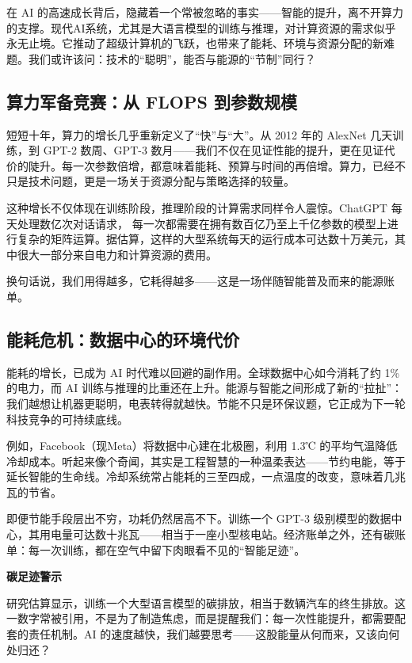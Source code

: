 在 AI 的高速成长背后，隐藏着一个常被忽略的事实——智能的提升，离不开算力的支撑。现代AI系统，尤其是大语言模型的训练与推理，对计算资源的需求似乎永无止境。它推动了超级计算机的飞跃，也带来了能耗、环境与资源分配的新难题。我们或许该问：技术的“聪明”，能否与能源的“节制”同行？

\subsection{算力军备竞赛：从 FLOPS 到参数规模}

短短十年，算力的增长几乎重新定义了“快”与“大”。从 2012 年的 AlexNet 几天训练，到 GPT-2 数周、GPT-3 数月——我们不仅在见证性能的提升，更在见证代价的陡升。每一次参数倍增，都意味着能耗、预算与时间的再倍增。算力，已经不只是技术问题，更是一场关于资源分配与策略选择的较量。

这种增长不仅体现在训练阶段，推理阶段的计算需求同样令人震惊。ChatGPT 每天处理数亿次对话请求，
每一次都需要在拥有数百亿乃至上千亿参数的模型上进行复杂的矩阵运算。据估算，这样的大型系统每天的运行成本可达数十万美元，其中很大一部分来自电力和计算资源的费用。

换句话说，我们用得越多，它耗得越多——这是一场伴随智能普及而来的能源账单。

\subsection{能耗危机：数据中心的环境代价}

能耗的增长，已成为 AI 时代难以回避的副作用。全球数据中心如今消耗了约 1\% 的电力，而 AI 训练与推理的比重还在上升。能源与智能之间形成了新的“拉扯”：我们越想让机器更聪明，电表转得就越快。节能不只是环保议题，它正成为下一轮科技竞争的可持续底线。

例如，Facebook（现Meta）将数据中心建在北极圈，利用 1.3℃ 的平均气温降低冷却成本。听起来像个奇闻，其实是工程智慧的一种温柔表达——节约电能，等于延长智能的生命线。冷却系统常占能耗的三至四成，一点温度的改变，意味着几兆瓦的节省。

即便节能手段层出不穷，功耗仍然居高不下。训练一个 GPT-3 级别模型的数据中心，其用电量可达数十兆瓦——相当于一座小型核电站。经济账单之外，还有碳账单：每一次训练，都在空气中留下肉眼看不见的“智能足迹”。

{\bf 碳足迹警示}

研究估算显示，训练一个大型语言模型的碳排放，相当于数辆汽车的终生排放。这一数字常被引用，不是为了制造焦虑，而是提醒我们：每一次性能提升，都需要配套的责任机制。AI 的速度越快，我们越要思考——这股能量从何而来，又该向何处归还？

